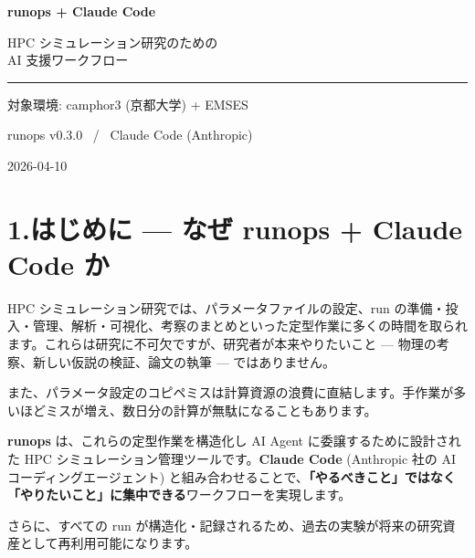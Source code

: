 \documentclass[a4paper,11pt]{article}
\begin{document}
\thispagestyle{empty}
\vspace*{5cm}

\begin{center}
{\Huge\bfseries\color{darkblue} runops + Claude Code}

\vspace{1cm}

{\Large\color{accent} HPC シミュレーション研究のための\\[4pt] AI 支援ワークフロー}

\vspace{2cm}

{\color{accent}\rule{8cm}{0.5pt}}

\vspace{1.5cm}

{\large 対象環境: camphor3 (京都大学) + EMSES}

\medskip

runops v0.3.0 ~/~ Claude Code (Anthropic)

\vspace{4cm}

{\small\color{gray} 2026-04-10}
\end{center}

\newpage

\section*{\color{darkblue} 1.\quad はじめに --- なぜ runops + Claude Code か}

HPC シミュレーション研究では、パラメータファイルの設定、run の準備・投入・管理、解析・可視化、考察のまとめといった定型作業に多くの時間を取られます。これらは研究に不可欠ですが、研究者が本来やりたいこと --- 物理の考察、新しい仮説の検証、論文の執筆 --- ではありません。

また、パラメータ設定のコピペミスは計算資源の浪費に直結します。手作業が多いほどミスが増え、数日分の計算が無駄になることもあります。

\textbf{runops} は、これらの定型作業を構造化し AI Agent に委譲するために設計された HPC シミュレーション管理ツールです。\textbf{Claude Code} (Anthropic 社の AI コーディングエージェント) と組み合わせることで、\textbf{「やるべきこと」ではなく「やりたいこと」に集中できる}ワークフローを実現します。

さらに、すべての run が構造化・記録されるため、過去の実験が将来の研究資産として再利用可能になります。
\end{document}
